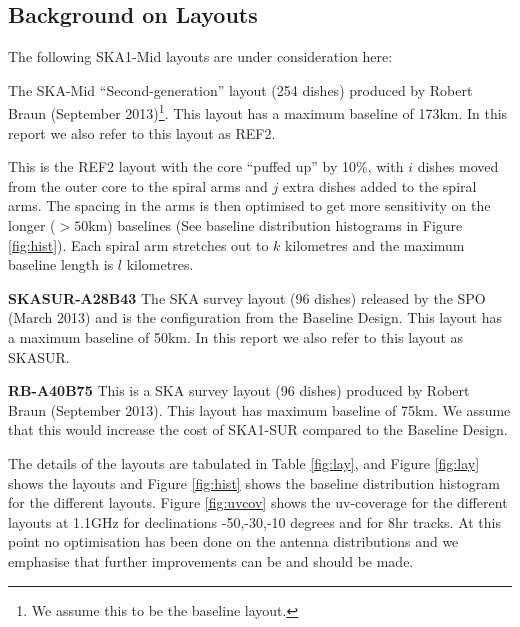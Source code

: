 \documentclass[sfheadings,a4paper,times,9pt,floats,floatfix]{article}
\begin{document}
\subsection{Background on Layouts}\label{sec:layouts}
The following SKA1-Mid layouts are under consideration here:
\begin{description}
\item[{\bf REF2A100B173}] The SKA-Mid ``Second-generation'' layout (254 dishes) produced by Robert Braun (September
2013)\footnote{We assume this to be the baseline layout.}. This layout has a maximum baseline of 173km. In this report we also refer to this
layout as
REF2.
\item[{\bf W$i$-$j$A$k$B$l$}] This is the REF2 layout with the core ``puffed up'' by 10\%,  with $ i$ dishes moved  from the
outer core to the spiral arms and $j$ extra dishes added to the spiral arms. The spacing in the arms is then optimised  to get
more sensitivity on the longer ($>50$km) baselines (See baseline distribution histograms in Figure \ref{fig:hist}). Each spiral
arm stretches out to $k$ kilometres and the maximum baseline length is $l$ kilometres.
\item {\bf SKASUR-A28B43} The SKA survey layout (96 dishes) released
  by the SPO (March 2013) and is the configuration from the Baseline Design. This layout
has a maximum baseline of 50km. In this report we also refer to this layout as SKASUR. 
\item {\bf RB-A40B75} This is a SKA survey layout (96 dishes) produced by Robert Braun (September 2013). This layout
has maximum baseline of 75km. We assume that this would increase the
cost of SKA1-SUR compared to the Baseline Design.
\end{description}
The details of the layouts are tabulated in Table \ref{fig:lay}, and Figure \ref{fig:lay} shows the layouts and Figure
\ref{fig:hist} shows the baseline distribution histogram for the different layouts. Figure \ref{fig:uvcov} shows the uv-coverage
for the different layouts at 1.1GHz for declinations -50,-30,-10 
degrees and for 8hr tracks. At this point no optimisation has been
done on the antenna distributions and we emphasise that further improvements can be and should be made.
\end{document}

